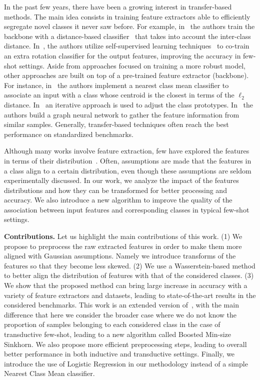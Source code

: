 \documentclass[review]{elsarticle}
\begin{document}
In the past few years, there have been a growing interest in transfer-based methods. The main idea consists in training feature extractors able to efficiently segregate novel classes it never saw before. For example, in~\cite{DBLP:conf/iclr/ChenLKWH19} the authors train the backbone with a distance-based classifier~\cite{mensink2012metric} that takes into account the inter-class distance. In~\cite{mangla2020charting}, the authors utilize self-supervised learning techniques~\cite{chapelle2009semi} to co-train an extra rotation classifier for the output features, improving the accuracy in few-shot settings. Aside from approaches focused on training a more robust model, other approaches are built on top of a pre-trained feature extractor (backbone). For instance, in~\cite{DBLP:journals/corr/abs-1911-04623} the authors implement a nearest class mean classifier to associate an input with a class whose centroid is the closest in terms of the $\ell_2$ distance. In~\cite{lichtenstein2020tafssl} an iterative approach is used to adjust the class prototypes. In~\cite{hu2021graph} the authors build a graph neural network to gather the feature information from similar samples. Generally, transfer-based techniques often reach the best performance on standardized benchmarks.

Although many works involve feature extraction, few have explored the features in terms of their distribution~\cite{8462273, DBLP:conf/iclr/YangLX21, mangla2020charting}. Often, assumptions are made that the features in a class align to a certain distribution, even though these assumptions are seldom experimentally discussed. In our work, we analyze the impact of the features distributions and how they can be transformed for better processing and accuracy. We also introduce a new algorithm to improve the quality of the association between input features and corresponding classes in typical few-shot settings.

\textbf{Contributions.} Let us highlight the main contributions of this work. (1) We propose to preprocess the raw extracted features in order to make them more aligned with Gaussian assumptions. Namely we introduce transforms of the features so that they become less skewed. (2) We use a Wasserstein-based method to better align the distribution of features with that of the considered classes. (3) We show that the proposed method can bring large increase in accuracy with a variety of feature extractors and datasets, leading to state-of-the-art results in the considered benchmarks. This work is an extended version of~\cite{hu2021leveraging}, with the main difference that here we consider the broader case where we do not know the proportion of samples belonging to each considered class in the case of transductive few-shot, leading to a new algorithm called Boosted Min-size Sinkhorn. We also propose more efficient preprocessing steps, leading to overall better performance in both inductive and transductive settings. Finally, we introduce the use of Logistic Regression in our methodology instead of a simple Nearest Class Mean classifier.
\end{document}
